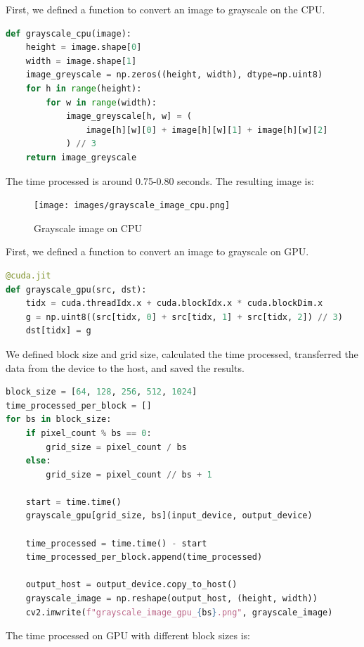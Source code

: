 \documentclass[12pt]{article}
\begin{document}
\noindent
First, we defined a function to convert an image to grayscale on the CPU. 

\begin{lstlisting}[language=Python]
def grayscale_cpu(image):
    height = image.shape[0]
    width = image.shape[1]
    image_greyscale = np.zeros((height, width), dtype=np.uint8)
    for h in range(height):
        for w in range(width):
            image_greyscale[h, w] = (
                image[h][w][0] + image[h][w][1] + image[h][w][2]
            ) // 3
    return image_greyscale
\end{lstlisting}

\noindent
The time processed is around 0.75-0.80 seconds. The resulting image is:

\begin{figure}[H]
\centering
    \texttt{[image: images/grayscale\_image\_cpu.png]}
    \caption{Grayscale image on CPU}
\end{figure}

\noindent
First, we defined a function to convert an image to grayscale on GPU. 

\begin{lstlisting}[language=Python]
@cuda.jit
def grayscale_gpu(src, dst):
    tidx = cuda.threadIdx.x + cuda.blockIdx.x * cuda.blockDim.x
    g = np.uint8((src[tidx, 0] + src[tidx, 1] + src[tidx, 2]) // 3)
    dst[tidx] = g
\end{lstlisting}

\noindent
We defined block size and grid size, calculated the time processed, transferred the data from the device to the host, and saved the results.

\begin{lstlisting}[language=Python]
block_size = [64, 128, 256, 512, 1024]
time_processed_per_block = []
for bs in block_size:
    if pixel_count % bs == 0:
        grid_size = pixel_count / bs
    else:
        grid_size = pixel_count // bs + 1

    start = time.time()
    grayscale_gpu[grid_size, bs](input_device, output_device)

    time_processed = time.time() - start
    time_processed_per_block.append(time_processed)

    output_host = output_device.copy_to_host()
    grayscale_image = np.reshape(output_host, (height, width))
    cv2.imwrite(f"grayscale_image_gpu_{bs}.png", grayscale_image)
\end{lstlisting}

\noindent
The time processed on GPU with different block sizes is:
\end{document}

